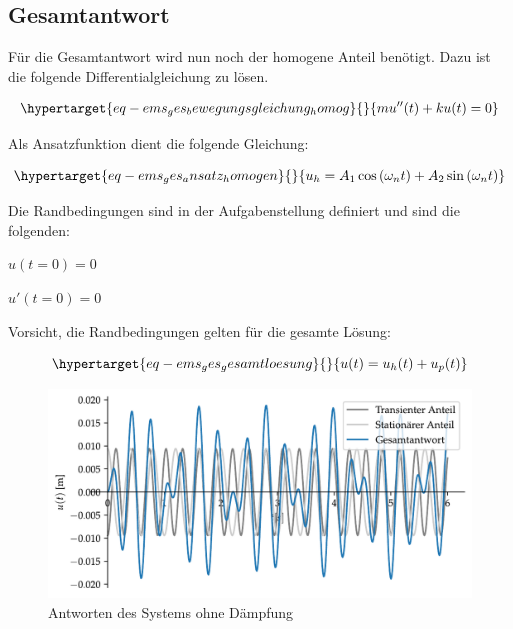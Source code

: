 \documentclass[
  letterpaper,
  DIV=11]{scrreprt}
\begin{document}
\hypertarget{gesamtantwort}{%
\subsection{Gesamtantwort}\label{gesamtantwort}}

Für die Gesamtantwort wird nun noch der homogene Anteil benötigt. Dazu
ist die folgende Differentialgleichung zu lösen.

\begin{equation}\protect\hypertarget{eq-ems_ges_bewegungsgleichung_homog}{}{
mu''(t)+ ku(t) = 0
}\label{eq-ems_ges_bewegungsgleichung_homog}\end{equation}

Als Ansatzfunktion dient die folgende Gleichung:

\begin{equation}\protect\hypertarget{eq-ems_ges_ansatz_homogen}{}{
u_h = A_1\cos{(\omega_n t)} + A_2 \sin{(\omega_n t)}
}\label{eq-ems_ges_ansatz_homogen}\end{equation}

Die Randbedingungen sind in der Aufgabenstellung definiert und sind die
folgenden:

\(u(t=0)=0\)

\(u'(t=0)=0\)

Vorsicht, die Randbedingungen gelten für die gesamte Lösung:

\begin{equation}\protect\hypertarget{eq-ems_ges_gesamtloesung}{}{
u(t) = u_h(t) + u_p(t)
}\label{eq-ems_ges_gesamtloesung}\end{equation}

\begin{figure}[H]

{\centering \includegraphics{index_files/mediabag/ems_04_files/figure-pdf/fig-ems_ges_gesamtantwort_ems4-output-1.pdf}

}

\caption{\label{fig-ems_ges_gesamtantwort_ems4}Antworten des Systems
ohne Dämpfung}

\end{figure}
\end{document}
